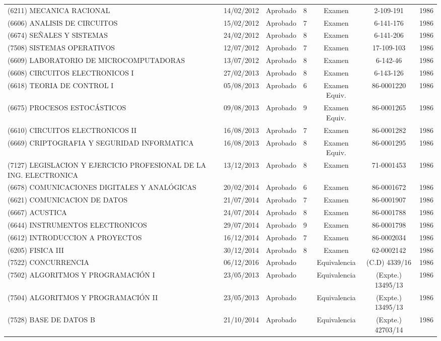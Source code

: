 \begin{table}[htb]
\begin{tabular}{p{4cm} *{6}{c}}
    (6211) MECANICA RACIONAL & 14/02/2012 & Aprobado & 8 & Examen & 2-109-191 & 1986 \tabularnewline

    (6606) ANALISIS DE CIRCUITOS & 15/02/2012 & Aprobado & 7 & Examen & 6-141-176 & 1986 \tabularnewline

    (6674) SEÑALES Y SISTEMAS & 24/02/2012 & Aprobado & 8 & Examen & 6-141-206 & 1986 \tabularnewline

    (7508) SISTEMAS OPERATIVOS & 12/07/2012 & Aprobado & 7 & Examen & 17-109-103 & 1986 \tabularnewline

    (6609) LABORATORIO DE MICROCOMPUTADORAS & 13/07/2012 & Aprobado & 8 & Examen & 6-142-46 & 1986 \tabularnewline

    (6608) CIRCUITOS ELECTRONICOS I & 27/02/2013 & Aprobado & 8 & Examen & 6-143-126 & 1986 \tabularnewline

    (6618) TEORIA DE CONTROL I & 05/08/2013 & Aprobado & 6 & Examen Equiv. & 86-0001220 & 1986 \tabularnewline

    (6675) PROCESOS ESTOCÁSTICOS & 09/08/2013 & Aprobado & 9 & Examen Equiv. & 86-0001265 & 1986 \tabularnewline

    (6610) CIRCUITOS ELECTRONICOS II & 16/08/2013 & Aprobado & 7 & Examen & 86-0001282 & 1986 \tabularnewline

    (6669) CRIPTOGRAFIA Y SEGURIDAD INFORMATICA & 16/08/2013 & Aprobado & 8 & Examen Equiv. & 86-0001295 & 1986 \tabularnewline

    (7127) LEGISLACION Y EJERCICIO PROFESIONAL DE LA ING. ELECTRONICA & 13/12/2013 & Aprobado & 8 & Examen & 71-0001453 & 1986 \tabularnewline

    (6678) COMUNICACIONES DIGITALES Y ANALÓGICAS & 20/02/2014 & Aprobado & 6 & Examen & 86-0001672 & 1986 \tabularnewline

    (6621) COMUNICACION DE DATOS & 21/07/2014 & Aprobado & 7 & Examen & 86-0001907 & 1986 \tabularnewline

    (6667) ACUSTICA & 24/07/2014 & Aprobado & 8 & Examen & 86-0001788 & 1986 \tabularnewline

    (6644) INSTRUMENTOS ELECTRONICOS & 29/07/2014 & Aprobado & 9 & Examen & 86-0001798 & 1986 \tabularnewline

    (6612) INTRODUCCION A PROYECTOS & 16/12/2014 & Aprobado & 7 & Examen & 86-0002034 & 1986 \tabularnewline

    (6205) FISICA III & 30/12/2014 & Aprobado & 8 & Examen & 62-0002142 & 1986 \tabularnewline

    (7522) CONCURRENCIA & 06/12/2016 & Aprobado & & Equivalencia & (C.D) 4339/16 & 1986  \tabularnewline

    (7502) ALGORITMOS Y PROGRAMACIÓN I & 23/05/2013 & Aprobado & & Equivalencia & (Expte.) 13495/13 & 1986  \tabularnewline

    (7504) ALGORITMOS Y PROGRAMACIÓN II & 23/05/2013 & Aprobado & & Equivalencia & (Expte.) 13495/13 & 1986  \tabularnewline

    (7528) BASE DE DATOS B & 21/10/2014 & Aprobado & & Equivalencia & (Expte.) 42703/14 & 1986  \tabularnewline

  \bottomrule
  \end{tabular}
\end{table}